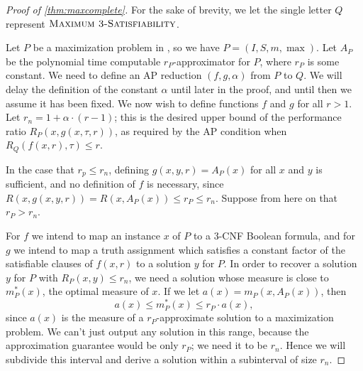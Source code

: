 \documentclass[]{article}
\begin{document}
\begin{proof}[Proof of \autoref{thm:maxcomplete}]
  For the sake of brevity, we let the single letter $Q$ represent $\textsc{Maximum 3-Satisfiability}$.

  Let $P$ be a maximization problem in \APX, so we have $P = (I, S, m, \max)$.
  Let $A_P$ be the polynomial time computable $r_P$-approximator for $P$, where $r_P$ is some constant.
  We need to define an AP reduction $(f, g, \alpha)$ from $P$ to $Q$.
  We will delay the definition of the constant $\alpha$ until later in the proof, and until then we assume it has been fixed.
  We now wish to define functions $f$ and $g$ for all $r > 1$.
  Let $r_n = 1 + \alpha \cdot (r - 1)$; this is the desired upper bound of the performance ratio $R_P(x, g(x, \tau, r))$, as required by the AP condition when $R_Q(f(x, r), \tau) \leq r$.

  In the case that $r_p \leq r_n$, defining $g(x, y, r) = A_P(x)$ for all $x$ and $y$ is sufficient, and no definition of $f$ is necessary, since $R(x, g(x, y, r)) = R(x, A_P(x)) \leq r_P \leq r_n$.
  Suppose from here on that $r_P > r_n$.

  For $f$ we intend to map an instance $x$ of $P$ to a 3-CNF Boolean formula, and for $g$ we intend to map a truth assignment which satisfies a constant factor of the satisfiable clauses of $f(x, r)$ to a solution $y$ for $P$.
  In order to recover a solution $y$ for $P$ with $R_P(x, y) \leq r_n$, we need a solution whose measure is close to $m^*_P(x)$, the optimal measure of $x$.
  If we let $a(x) = m_P(x, A_P(x))$, then
  \begin{equation}\label{eq:bounds}
    a(x) \leq m^*_P(x) \leq r_P \cdot a(x),
  \end{equation}
  since $a(x)$ is the measure of a $r_P$-approximate solution to a maximization problem.
  We can't just output any solution in this range, because the approximation guarantee would be only $r_P$; we need it to be $r_n$.
  Hence we will subdivide this interval and derive a solution within a subinterval of size $r_n$.


\end{proof}
\end{document}
